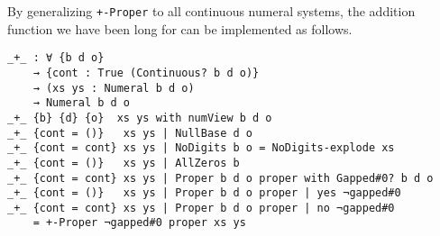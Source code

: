 \documentclass[\main/thesis.tex]{subfiles}
\begin{document}
By generalizing \lstinline|+-Proper| to all continuous numeral systems,
the addition function we have been long for can be implemented as follows.

\begin{lstlisting}[basicstyle=\ttfamily\scriptsize]
_+_ : ∀ {b d o}
    → {cont : True (Continuous? b d o)}
    → (xs ys : Numeral b d o)
    → Numeral b d o
_+_ {b} {d} {o}  xs ys with numView b d o
_+_ {cont = ()}   xs ys | NullBase d o
_+_ {cont = cont} xs ys | NoDigits b o = NoDigits-explode xs
_+_ {cont = ()}   xs ys | AllZeros b
_+_ {cont = cont} xs ys | Proper b d o proper with Gapped#0? b d o
_+_ {cont = ()}   xs ys | Proper b d o proper | yes ¬gapped#0
_+_ {cont = cont} xs ys | Proper b d o proper | no ¬gapped#0
    = +-Proper ¬gapped#0 proper xs ys
\end{lstlisting}
\end{document}

